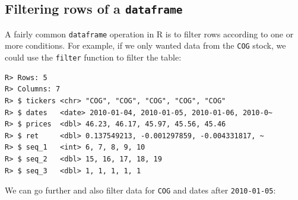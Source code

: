 \documentclass[
  12pt,
]{book}
\newenvironment{Shaded}{\begin{snugshade}}{\end{snugshade}}
\newcommand{\CommentTok}[1]{\textcolor[rgb]{0.37,0.37,0.37}{\textit{#1}}}
\newcommand{\KeywordTok}[1]{\textcolor[rgb]{0.27,0.27,0.27}{\textbf{#1}}}
\newcommand{\NormalTok}[1]{#1}
\newcommand{\OperatorTok}[1]{\textcolor[rgb]{0.43,0.43,0.43}{\textbf{#1}}}
\newcommand{\StringTok}[1]{\textcolor[rgb]{0.5,0.5,0.5}{#1}}
\begin{document}
\hypertarget{filtering-rows-of-a-dataframe}{%
\subsection{\texorpdfstring{Filtering rows of a \texttt{dataframe}}{Filtering rows of a dataframe}}\label{filtering-rows-of-a-dataframe}}

A fairly common \texttt{dataframe} operation in R is to filter rows according to one or more conditions. For example, if we only wanted data from the \texttt{\textquotesingle{}COG\textquotesingle{}} stock, we could use the \texttt{filter} function to filter the table: 

\begin{Shaded}
\end{Shaded}

\begin{verbatim}
R> Rows: 5
R> Columns: 7
R> $ tickers <chr> "COG", "COG", "COG", "COG", "COG"
R> $ dates   <date> 2010-01-04, 2010-01-05, 2010-01-06, 2010-0~
R> $ prices  <dbl> 46.23, 46.17, 45.97, 45.56, 45.46
R> $ ret     <dbl> 0.137549213, -0.001297859, -0.004331817, ~
R> $ seq_1   <int> 6, 7, 8, 9, 10
R> $ seq_2   <dbl> 15, 16, 17, 18, 19
R> $ seq_3   <dbl> 1, 1, 1, 1, 1
\end{verbatim}

We can go further and also filter data for \texttt{\textquotesingle{}COG\textquotesingle{}} and dates after \texttt{\textquotesingle{}2010-01-05\textquotesingle{}}:

\begin{Shaded}
\end{Shaded}
\end{document}
